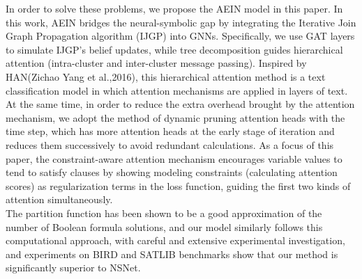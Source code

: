 In order to solve these problems, we propose the AEIN model in this paper. In this work, AEIN bridges the neural-symbolic gap by integrating the Iterative Join Graph Propagation  algorithm (IJGP)\cite{A15} into GNNs.   Specifically, we use GAT layers to simulate IJGP's belief updates, while tree decomposition guides hierarchical attention (intra-cluster and inter-cluster message passing). Inspired by HAN(Zichao Yang et al.,2016)\cite{B5}, this hierarchical attention method is a text classification model in which attention mechanisms are applied in layers of text. At the same time, in order to reduce the extra overhead brought by the attention mechanism, we adopt the method of dynamic pruning attention heads with the time step\cite{B6}\cite{A16}, which has more attention heads at the early stage of iteration and reduces them successively to avoid redundant calculations. As a focus of this paper, the constraint-aware attention mechanism encourages variable values to tend to satisfy clauses by showing modeling constraints (calculating attention scores) as regularization terms in the loss function, guiding the first two kinds of attention simultaneously. \\
The partition function has been shown to be a good approximation of the number of Boolean formula solutions\cite{A17}\cite{A18}, and our model similarly follows this computational approach, with careful and extensive experimental investigation, and experiments on BIRD and SATLIB benchmarks show that our method is significantly superior to NSNet. 